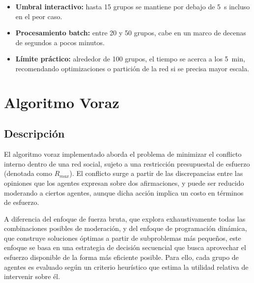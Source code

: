 \documentclass[11pt,letter]{article}
\begin{document}
\begin{itemize}
    \begin{itemize}

         \item \textbf{Umbral interactivo:}
        hasta 15 grupos se mantiene por debajo de 5 s incluso en el peor caso.

        \item \textbf{Procesamiento batch:}
        entre 20 y 50 grupos, cabe en un marco de decenas de segundos a pocos minutos.

        \item \textbf{Límite práctico:}
         alrededor de 100 grupos, el tiempo se acerca a los 5 min, recomendando optimizaciones o partición de la red si se precisa mayor escala.

    \end{itemize}


\end{itemize}



    \newpage



    \section{Algoritmo Voraz}

    \subsection{Descripción}
    El algoritmo voraz implementado aborda el problema de minimizar el conflicto interno dentro de una red social, sujeto a una restricción presupuestal de esfuerzo (denotada como $R_{max}$). El conflicto surge a partir de las discrepancias entre las opiniones que los agentes expresan sobre dos afirmaciones, y puede ser reducido moderando a ciertos agentes, aunque dicha acción implica un costo en términos de esfuerzo.

    A diferencia del enfoque de fuerza bruta, que explora exhaustivamente todas las combinaciones posibles de moderación, y del enfoque de programación dinámica, que construye soluciones óptimas a partir de subproblemas más pequeños, este enfoque se basa en una estrategia de decisión secuencial que busca aprovechar el esfuerzo disponible de la forma más eficiente posible. Para ello, cada grupo de agentes es evaluado según un criterio heurístico que estima la utilidad relativa de intervenir sobre él.
\end{document}
